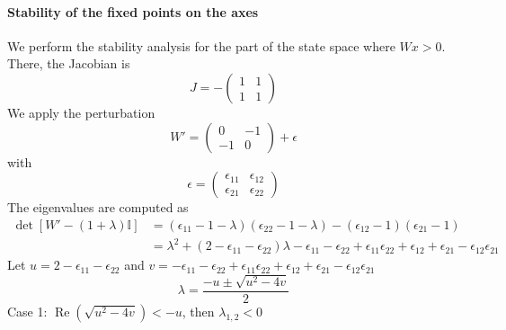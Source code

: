 \documentclass{article} %
\newcounter{ct}
\newcommand{\win}{\vW_{\text{in}}}
\newcommand{\wout}{\vW_{\text{out}}}
\newcommand{\bout}{\vb_{\text{out}}}
\theoremstyle{definition}
\theoremstyle{remark}
\begin{document}






\paragraph{Stability of the fixed points on the axes}
We perform the stability analysis for the part of the state space where \(Wx>0\).
There, the Jacobian is
\begin{equation}
J = -
\begin{pmatrix}
1  &  1 \\
1  &  1
\end{pmatrix}
\end{equation}
We apply the perturbation
\begin{equation}
W' =
\begin{pmatrix}
0  &  -1 \\
-1  &  0
\end{pmatrix}
+ \epsilon
\end{equation}with
\begin{equation}
\epsilon =
\begin{pmatrix}
\epsilon_{11}  &  \epsilon_{12} \\
\epsilon_{21}  &  \epsilon_{22}
\end{pmatrix}
\end{equation}
The eigenvalues are computed as
\begin{align*}
\det [W' -(1+\lambda)\mathbb{I}] &= (\epsilon_{11}-1-\lambda)(\epsilon_{22}-1-\lambda)-(\epsilon_{12}-1)(\epsilon_{21}-1)\\
&=\lambda^{2} + (2-\epsilon_{11}-\epsilon_{22})\lambda -\epsilon_{11}-\epsilon_{22}+\epsilon_{11}\epsilon_{22} +\epsilon_{12} + \epsilon_{21} - \epsilon_{12}\epsilon_{21}
\end{align*}
Let
\(u = 2-\epsilon_{11}-\epsilon_{22}\)
and
\(v=-\epsilon_{11}-\epsilon_{22}+\epsilon_{11}\epsilon_{22} + \epsilon_{12} + \epsilon_{21} - \epsilon_{12}\epsilon_{21}\)
\begin{equation}
\lambda = \frac{-u \pm \sqrt{u^{2} - 4v}}{2}
\end{equation}
Case 1: \(\operatorname{Re}(\sqrt{u^{2} - 4v})<-u\), then
\(\lambda_{1, 2}<0\)
\end{document}
